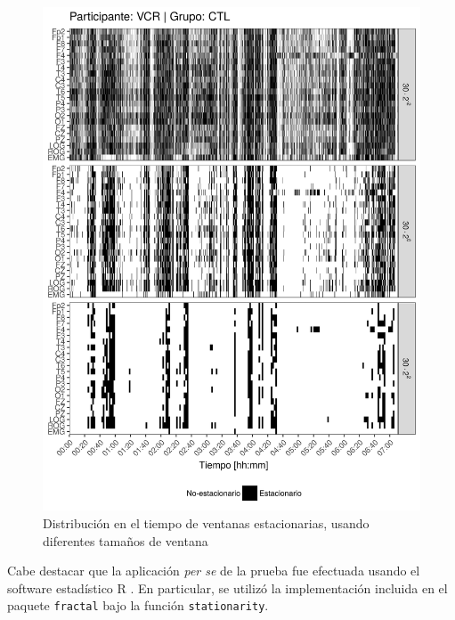 \begin{figure}
\centering
\includegraphics[width=\linewidth]
{./img_art_dfa/VCNNS1_comp_est_.png}
\caption{Distribución en el tiempo de ventanas estacionarias, usando diferentes tamaños
de ventana}
\label{comp_VCR}
\end{figure}

%


Cabe destacar que la aplicación \textit{per se} de la prueba fue efectuada usando el software 
estadístico R \cite{R_citar}. En particular, se utilizó la implementación 
incluida en el paquete \texttt{fractal} \cite{R_fractal} bajo la función \texttt{stationarity}.


